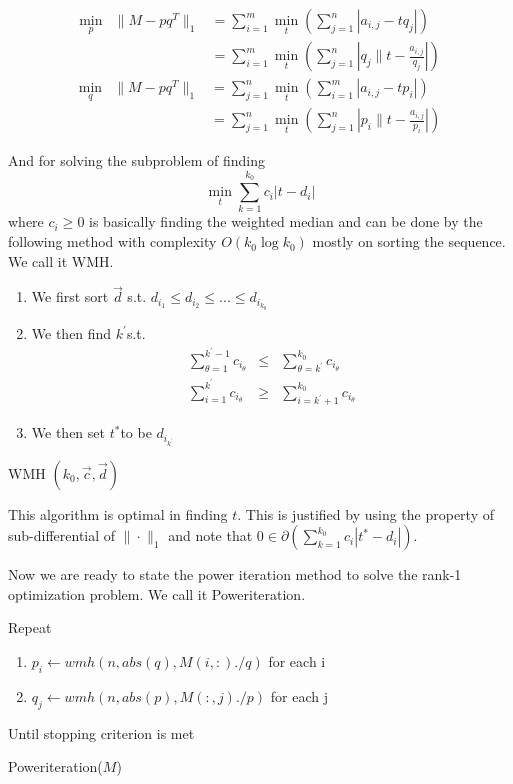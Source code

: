 \begin{eqnarray}
\min_{p} & \|M-pq^{T}\|_{1} & =\sum_{i=1}^{m}\min_{t}(\sum_{j=1}^{n}|a_{i,j}-tq_{j}|)\\
 &  & =\sum_{i=1}^{m}\min_{t}(\sum_{j=1}^{n}|q_{j}\|t-\frac{a_{i,j}}{q_{j}}|)\nonumber
\end{eqnarray}
\begin{eqnarray}
\min_{q} & \|M-pq^{T}\|_{1} & =\sum_{j=1}^{n}\min_{t}(\sum_{i=1}^{m}|a_{i,j}-tp_{i}|)\\
 &  & =\sum_{j=1}^{n}\min_{t}(\sum_{j=1}^{n}|p_{i}\|t-\frac{a_{i,j}}{p_{i}}|)\nonumber
\end{eqnarray}


And for solving the subproblem of finding
\[
\min_{t}\sum_{k=1}^{k_{0}}c_{i}|t-d_{i}|
\]
where $c_{i}\ge0$ is basically finding the weighted median and can
be done by the following method with complexity $O(k_{0}\log k_{0})$
mostly on sorting the sequence. We call it WMH.

\begin{algorithm}[h]
\begin{enumerate}
\item We first sort $\vec{\ensuremath{d}}$ s.t. $d_{i_{1}}\le d_{i_{2}}\le...\le d_{i_{k_{0}}}$
\item We then find $k^{'}$s.t.
\begin{eqnarray*}
\sum_{\theta=1}^{k^{'}-1}c_{i_{\theta}} & \le & \sum_{\theta=k^{'}}^{k_{0}}c_{i_{\theta}}\\
\sum_{i=1}^{k^{'}}c_{i_{\theta}} & \ge & \sum_{i=k^{'}+1}^{k_{0}}c_{i_{\theta}}
\end{eqnarray*}

\item We then set $t^{*}$to be $d_{i_{k^{'}}}$
\end{enumerate}
\caption{WMH $(k_{0},\vec{c},\vec{d})$}
\end{algorithm}


This algorithm is optimal in finding $t$. This is justified by using
the property of sub-differential of $\|\cdot\|_{1}$ and note that
$0\in\partial(\sum_{k=1}^{k_{0}}c_{i}|t^{*}-d_{i}|)$.

Now we are ready to state the power iteration method to solve the
rank-1 optimization problem. We call it Poweriteration.

\begin{algorithm}[h]
Repeat
\begin{enumerate}
\item $p_{i}\leftarrow wmh(n,abs(q),M(i,:)./q)$ for each i
\item $q_{j}\leftarrow wmh(n,abs(p),M(:,j)./p)$ for each j
\end{enumerate}
Until stopping criterion is met

\caption{Poweriteration($M$)}
\end{algorithm}



